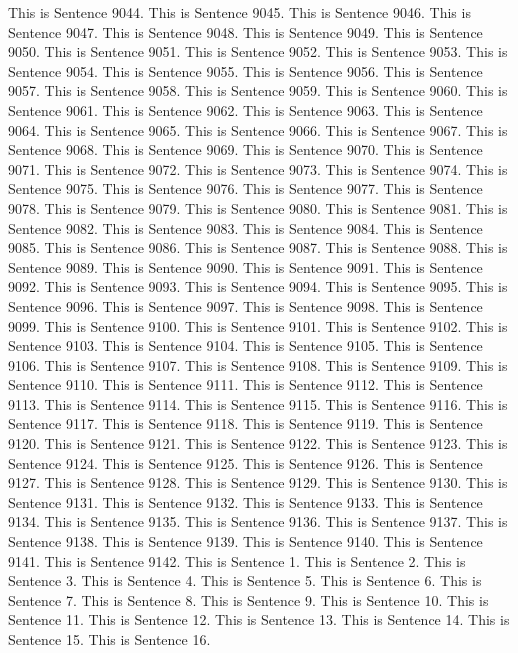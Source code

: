 \documentclass{article}
\begin{document}
This is Sentence 9044.
This is Sentence 9045.
This is Sentence 9046.
This is Sentence 9047.
This is Sentence 9048.
This is Sentence 9049.
This is Sentence 9050.
This is Sentence 9051.
This is Sentence 9052.
This is Sentence 9053.
This is Sentence 9054.
This is Sentence 9055.
This is Sentence 9056.
This is Sentence 9057.
This is Sentence 9058.
This is Sentence 9059.
This is Sentence 9060.
This is Sentence 9061.
This is Sentence 9062.
This is Sentence 9063.
This is Sentence 9064.
This is Sentence 9065.
This is Sentence 9066.
This is Sentence 9067.
This is Sentence 9068.
This is Sentence 9069.
This is Sentence 9070.
This is Sentence 9071.
This is Sentence 9072.
This is Sentence 9073.
This is Sentence 9074.
This is Sentence 9075.
This is Sentence 9076.
This is Sentence 9077.
This is Sentence 9078.
This is Sentence 9079.
This is Sentence 9080.
This is Sentence 9081.
This is Sentence 9082.
This is Sentence 9083.
This is Sentence 9084.
This is Sentence 9085.
This is Sentence 9086.
This is Sentence 9087.
This is Sentence 9088.
This is Sentence 9089.
This is Sentence 9090.
This is Sentence 9091.
This is Sentence 9092.
This is Sentence 9093.
This is Sentence 9094.
This is Sentence 9095.
This is Sentence 9096.
This is Sentence 9097.
This is Sentence 9098.
This is Sentence 9099.
This is Sentence 9100.
This is Sentence 9101.
This is Sentence 9102.
This is Sentence 9103.
This is Sentence 9104.
This is Sentence 9105.
This is Sentence 9106.
This is Sentence 9107.
This is Sentence 9108.
This is Sentence 9109.
This is Sentence 9110.
This is Sentence 9111.
This is Sentence 9112.
This is Sentence 9113.
This is Sentence 9114.
This is Sentence 9115.
This is Sentence 9116.
This is Sentence 9117.
This is Sentence 9118.
This is Sentence 9119.
This is Sentence 9120.
This is Sentence 9121.
This is Sentence 9122.
This is Sentence 9123.
This is Sentence 9124.
This is Sentence 9125.
This is Sentence 9126.
This is Sentence 9127.
This is Sentence 9128.
This is Sentence 9129.
This is Sentence 9130.
This is Sentence 9131.
This is Sentence 9132.
This is Sentence 9133.
This is Sentence 9134.
This is Sentence 9135.
This is Sentence 9136.
This is Sentence 9137.
This is Sentence 9138.
This is Sentence 9139.
This is Sentence 9140.
This is Sentence 9141.
This is Sentence 9142.
This is Sentence 1.
This is Sentence 2.
This is Sentence 3.
This is Sentence 4.
This is Sentence 5.
This is Sentence 6.
This is Sentence 7.
This is Sentence 8.
This is Sentence 9.
This is Sentence 10.
This is Sentence 11.
This is Sentence 12.
This is Sentence 13.
This is Sentence 14.
This is Sentence 15.
This is Sentence 16.
\end{document}
